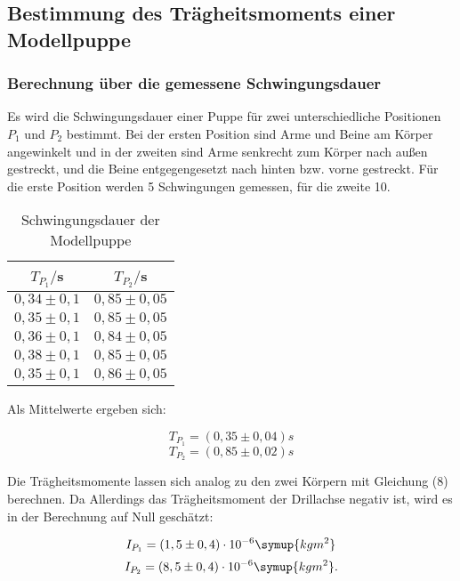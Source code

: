 \subsection{Bestimmung des Trägheitsmoments einer Modellpuppe}
\subsubsection{Berechnung über die gemessene Schwingungsdauer}
Es wird die Schwingungsdauer einer Puppe für zwei unterschiedliche 
Positionen $P_\text{1}$ und $P_\text{2}$ bestimmt. Bei der ersten Position sind Arme und Beine am Körper angewinkelt und in der zweiten
sind Arme senkrecht zum Körper nach außen gestreckt, und die Beine entgegengesetzt nach hinten bzw. vorne gestreckt.
Für die erste Position werden 5 Schwingungen gemessen, für die zweite 10.
\begin{table}[H]
  \centering
  \caption{Schwingungsdauer der Modellpuppe}
  \label{tab:Schwingungsdauer der Modellpuppe}
  \begin{tabular}{c c}
    \toprule
    $T_{P_1}/$s & $T_{P_2}/$s \\
    \midrule
    $0,34 \pm 0,1$ & $0,85 \pm 0,05$ \\
    $0,35 \pm 0,1$ & $0,85 \pm 0,05$ \\
    $0,36 \pm 0,1$ & $0,84 \pm 0,05$ \\
    $0,38 \pm 0,1$ & $0,85 \pm 0,05$ \\
    $0,35 \pm 0,1$ & $0,86 \pm 0,05$ \\
    \bottomrule
  \end{tabular}
\end{table}

Als Mittelwerte ergeben sich:

\begin{equation}
T_{P_1} = (0,35 \pm 0,04) s
\end{equation}
\begin{equation}
T_{P_2}= (0,85 \pm 0,02) s
\end{equation}

Die Trägheitsmomente lassen sich analog zu den zwei Körpern mit Gleichung (8) berechnen.
Da Allerdings das Trägheitsmoment der Drillachse negativ ist, wird es in der Berechnung auf Null geschätzt:

\begin{equation}
I_{P_1}  = (1,5 \pm 0,4)\cdot 10^{-6} \symup{kgm^2} 
\end{equation}
\begin{equation}
I_{P_2}  = (8,5 \pm 0,4)\cdot 10^{-6} \symup{kgm^2} .
\end{equation}

